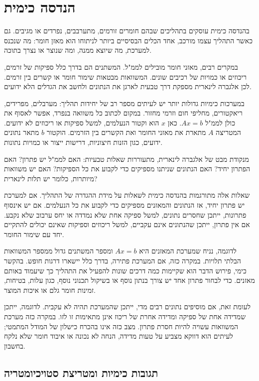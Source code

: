 \documentclass[12pt]{report}
\theoremstyle{plain}
\theoremstyle{definition}
\newcommand{\0}{\mathbf{0}}
\begin{document}
\section{הנדסה כימית}

בהנדסה כימית עוסקים בתהליכים שבהם חומרים זורמים, מתערבבים, נפרדים או מגיבים.
גם כאשר התהליך עצמו מורכב, אחד הכלים הבסיסיים ביותר לניתוחו הוא מאזן חומר:
מה שנכנס למערכת, מה שיוצא ממנה, ומה שנוצר או נצרך בתוכה.

במקרים רבים, מאזני חומר מובילים לממ"ל.
המשתנים הם בדרך כלל ספיקות של זרמים, ריכוזים או כמויות של רכיבים שונים.
המשוואות מבטאות שימור חומר או קשרים בין זרמים.
לכן אלגברה לינארית מספקת דרך טבעית לארגן את הנתונים ולחשב את הגדלים הלא ידועים.

במערכות כימיות גדולות יותר יש לעיתים מספר רב של יחידות תהליך:
מערבלים, מפרידים, ריאקטורים, מחליפי חום וזרמי מחזור.
במקום לכתוב כל משוואה בנפרד, אפשר לאסוף את כולן לממ"ל
$Ax=b$.
כאן
$x$
הוא וקטור הנעלמים, למשל ספיקות או ריכוזים לא ידועים.
המטריצה
$A$
מתארת את מאזני החומר ואת הקשרים בין הזרמים.
הוקטור
$b$
מתאר נתונים ידועים, כגון הזנות חיצוניות, דרישות ייצור או כמויות נתונות.

מנקודת מבט של אלגברה לינארית, מתעוררות שאלות טבעיות:
האם לממ"ל יש פתרון? האם הפתרון יחיד? האם הנתונים שניתנו מספיקים כדי לקבוע את כל הספיקות? האם יש משוואות מיותרות, כלומר יש תלות לינארית?

שאלות אלה מתורגמות בהנדסה כימית לשאלות על מידת ההגדרה של התהליך.
אם למערכת יש פתרון יחיד, אז הנתונים והמאזנים מספיקים כדי לקבוע את כל הנעלמים.
אם יש אינסוף פתרונות, ייתכן שחסרים נתונים, למשל ספיקה אחת שלא נמדדה או יחס ערבוב שלא נקבע.
אם אין פתרון, ייתכן שהנתונים אינם עקביים, למשל ריכוזים וספיקות שאינם יכולים להתקיים יחד עם שימור החומר.

לדוגמה, נניח שמערכת המאזנים היא
$Ax=b$
ומספר המשתנים גדול ממספר המשוואות הבלתי תלויות. במקרה כזה, אם המערכת פתירה, בדרך כלל יישארו דרגות חופש. 
בהקשר כימי, פירוש הדבר הוא שקיימות כמה דרכים שונות להפעיל את התהליך כך שיעמוד באותם מאזנים.
כדי לבחור פתרון אחד יש צורך בנתון נוסף או בשיקול תכנוני נוסף, כגון עלות, בטיחות, זמינות חומר גלם או איכות המוצר.

לעומת זאת, אם מוסיפים נתונים רבים מדי, ייתכן שהמערכת תהיה לא עקבית. לדוגמה, ייתכן שמדידה אחת של ספיקה ומדידה אחרת של ריכוז אינן מתאימות זו לזו. במקרה כזה מערכת המשוואות עשויה להיות חסרת פתרון.
מצב כזה אינו בהכרח כישלון של המודל המתמטי; לעיתים הוא דווקא מצביע על טעות מדידה, הנחה לא נכונה או איבוד חומר שלא נלקח בחשבון.

\subsection*{תגובות כימיות ומטריצת סטויכיומטריה}
\end{document}
